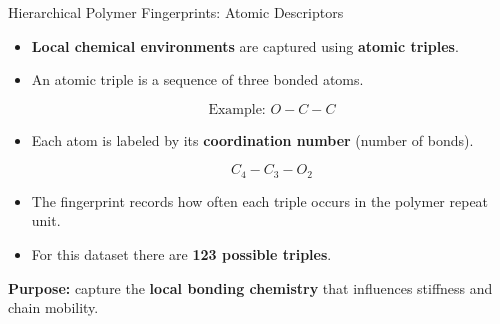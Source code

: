 \documentclass[9pt]{beamer}
\begin{document}
\begin{frame}{Hierarchical Polymer Fingerprints: Atomic Descriptors}

\begin{itemize}
\setlength{\itemsep}{1em}

\item \textbf{Local chemical environments} are captured using \textbf{atomic triples}.

\item An atomic triple is a sequence of three bonded atoms.

\[
\text{Example: } O{-}C{-}C
\]

\item Each atom is labeled by its \textbf{coordination number}
(number of bonds).

\[
C_4{-}C_3{-}O_2
\]

\item The fingerprint records how often each triple occurs in the
polymer repeat unit.

\item For this dataset there are \textbf{123 possible triples}.

\end{itemize}

\vspace{0.5em}

\textbf{Purpose:} capture the \textbf{local bonding chemistry}
that influences stiffness and chain mobility.

\end{frame}
\end{document}
